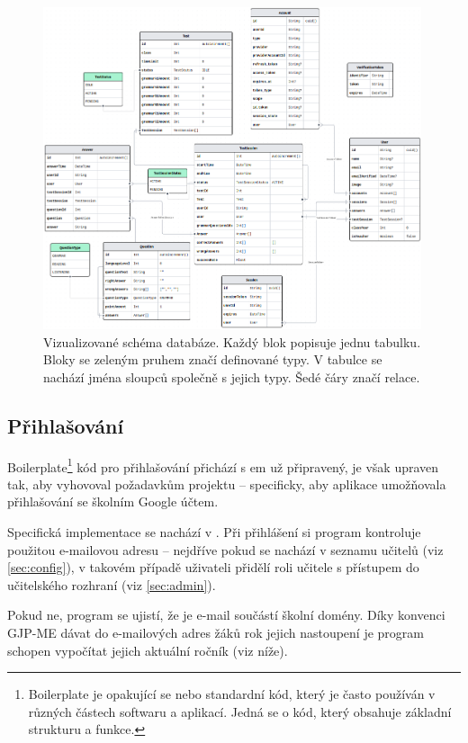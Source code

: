 \begin{figure}[H]
    \centering
    \includegraphics[width=420px]{images/02technologie/schema3.png}
    \caption{Vizualizované schéma databáze. \newline Každý blok popisuje jednu tabulku. Bloky se zeleným pruhem značí definované typy. V tabulce se nachází jména sloupců společně s jejich typy. Šedé čáry značí relace.}
    \label{schema}
\end{figure}


\subsection{Přihlašování}
\label{sec:login}

Boilerplate\footnote{Boilerplate je opakující se nebo standardní kód, který je často používán v různých částech softwaru a aplikací. Jedná se o kód, který obsahuje základní strukturu a funkce.} kód pro přihlašování přichází s em už připravený, je však upraven tak, aby vyhovoval požadavkům projektu -- specificky, aby aplikace umožňovala přihlašování se školním Google účtem.

Specifická implementace se nachází v . \newline Při přihlášení si program kontroluje použitou e-mailovou adresu -- nejdříve pokud se nachází v seznamu učitelů (viz \ref{sec:config}), v takovém případě uživateli přidělí roli učitele s přístupem do učitelského rozhraní (viz \ref{sec:admin}). 

Pokud ne, program se ujistí, že je e-mail součástí školní domény. Díky konvenci GJP-ME dávat do e-mailových adres žáků rok jejich nastoupení je program schopen vypočítat jejich aktuální ročník (viz níže).

